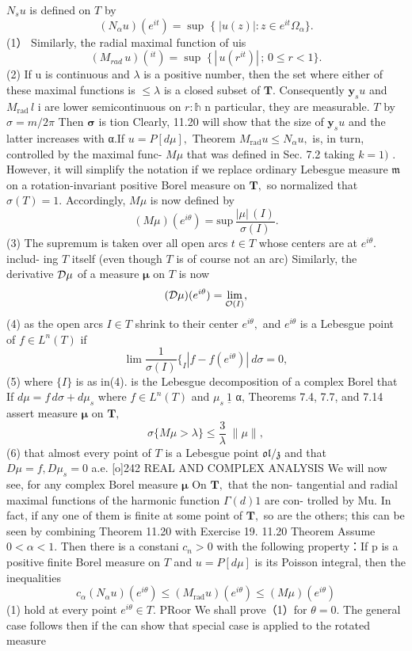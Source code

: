 $\scriptstyle N_{s}u$ is defined on ${\mathbf{}}T$ by $$ (N_{\alpha}u)(e^{i t})=\operatorname*{sup}\;\{\;|u(z)|\!:z\in e^{i t}\Omega_{\alpha}\}. $$ (1） Similarly, the radial maximal function of uis $$ (M_{r a d}\,u)(^{i t})=\operatorname*{sup}\;\{\,|\,u(r^{i t})|\,;\,0\leq r<1\}. $$ (2) If u is continuous and $\lambda$ is a positive number, then the set where either of these maximal functions is $\leq\lambda$ is a closed subset of ${\boldsymbol{T}}.$ Consequently $\scriptstyle\mathbf{y}_{s}u$ and $M_{\mathrm{rad}}\,l$ i are lower semicontinuous on $\scriptstyle r:\mathbb{h}$ n particular, they are measurable. ${\mathbf{}}T$ by $\sigma=m/2\pi$ Then $\textstyle{\boldsymbol{\sigma}}$ is tion Clearly, 11.20 will show that the size of $\scriptstyle\mathbf{y}_{s}u$ and the latter increases with α.If $u=P[d\mu],$ Theorem $M_{\mathrm{rad}}u\leq N_{\alpha}u,$ is, in turn, controlled by the maximal func- $\textstyle{M\mu}$ that was defined in Sec. 7.2 taking $k=1)$ . However, it will simplify the notation if we replace ordinary Lebesgue measure ${\mathfrak{m}}\,$ on a rotation-invariant positive Borel measure on ${\boldsymbol{T}},$ so normalized that $\sigma(T)=1.$ Accordingly, $M\mu$ is now defined by $$ (M\mu)(e^{i\theta})=\mathrm{sup}\,\frac{|\mu|\,(I)}{\sigma(I)}. $$ (3) The supremum is taken over all open arcs $\scriptstyle{t\in T}$ whose centers are at $e^{i\theta}.$ includ- ing ${\mathbf{}}T$ itself (even though ${\mathbf{}}T$ is of course not an arc) Similarly, the derivative ${\cal{D}}\mu$ of a measure $\boldsymbol{\mu}$ on ${\mathbf{}}T$ is now $$ ({\cal D}\mu)(e^{i\theta})=\operatorname*{lim}_{\mathcal{O}(I)}, $$ (4) as the open arcs $\scriptstyle{I\in T}$ shrink to their center $e^{i\theta},$ and $e^{i\theta}$ is a Lebesgue point of $f\in L^{n}(T)$ if $$ \textstyle\operatorname*{lim}\frac{1}{\sigma(I)} \{_{I}|f-f(e^{i\theta})|\ d\sigma=0, $$ (5) where $\{I\}$ is as in(4). is the Lebesgue decomposition of a complex Borel that If $d\mu=f\,d\sigma+d\mu_{s}$ where $f\in L^{n}(T)$ and $\mu_{s}~\underline{{{1}}}$ α, Theorems 7.4, 7.7, and 7.14 assert measure ${\boldsymbol{\mu}}$ on ${\boldsymbol{T}},$ $$ \sigma\{M\mu>\lambda\}\leq{\frac{3}{\lambda}}\;\|\mu\|, $$ (6) that almost every point of ${\mathbf{}}T$ is a Lebesgue point ${\mathfrak{o l}}/{\mathfrak{z}}$ and that $D\mu=f,D\mu_{s}=0$ a.e. [o]242 REAL AND COMPLEX ANALYSIS We will now see, for any complex Borel measure ${\boldsymbol{\mu}}$ On ${\boldsymbol{T}},$ that the non- tangential and radial maximal functions of the harmonic function $\scriptstyle\Gamma(d)1$ are con- trolled by Mu. In fact, if any one of them is finite at some point of ${\boldsymbol{T}},$ so are the others; this can be seen by combining Theorem 11.20 with Exercise 19. 11.20 Theorem Assume $0<\alpha<1.$ Then there is a constani $\scriptstyle c_{n}>0$ with the following property：If p is a positive finite Borel measure on ${\mathbf{}}T$ and $u=P[d\mu]$ is its Poisson integral, then the inequalities $$ c_{\alpha}(N_{\alpha}u)(e^{i\theta})\leq(M_{\mathrm{rad}}u)(e^{i\theta})\leq(M\mu)(e^{i\theta}) $$ (1) hold at every point $e^{i\theta}\in T.$ PRoor We shall prove（1）for $\theta=0.$ The general case follows then if the can show that special case is applied to the rotated measure 